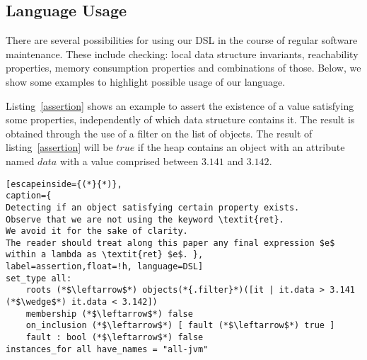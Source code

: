 


\subsection{Language Usage}

There are several possibilities for using our DSL in the course of regular software maintenance.
These include checking: local data structure invariants, reachability properties, memory consumption properties and combinations of those.
Below, we show some examples to highlight possible usage of our language. 
 
Listing~\ref{assertion} shows an example to assert the existence of a value satisfying some properties, independently of which data structure contains it. 
The result is obtained through the use of a filter on the list of objects.
The result of listing~\ref{assertion} will be $true$ if the heap contains an object with an attribute named $data$ with a value comprised between $3.141$ and $3.142$.

\begin{lstlisting}[escapeinside={(*}{*)},
caption={
Detecting if an object satisfying certain property exists.
Observe that we are not using the keyword \textit{ret}.
We avoid it for the sake of clarity.
The reader should treat along this paper any final expression $e$ within a lambda as \textit{ret} $e$. },
label=assertion,float=!h, language=DSL]
set_type all: 
	roots (*$\leftarrow$*) objects(*{.filter}*)([it | it.data > 3.141 (*$\wedge$*) it.data < 3.142])
	membership (*$\leftarrow$*) false
	on_inclusion (*$\leftarrow$*) [ fault (*$\leftarrow$*) true ]
	fault : bool (*$\leftarrow$*) false
instances_for all have_names = "all-jvm"
\end{lstlisting}

